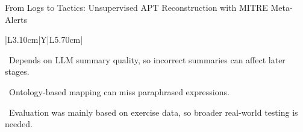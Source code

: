 \begin{frame}[t]{From Logs to Tactics: Unsupervised APT Reconstruction with MITRE Meta-Alerts}
{\begin{tabularx}{\textwidth}{|L{3.10cm}|Y|L{5.70cm}|}
\begin{minipage}[t]{\linewidth}
\textbullet~Depends on LLM summary quality, so incorrect summaries can affect later stages.\par\vspace{1.8pt}\textbullet~Ontology-based mapping can miss paraphrased expressions.\par\vspace{1.8pt}\textbullet~Evaluation was mainly based on exercise data, so broader real-world testing is needed.\par\vspace{3pt}
\end{minipage} \\\hline
\end{tabularx}}
\end{frame}

